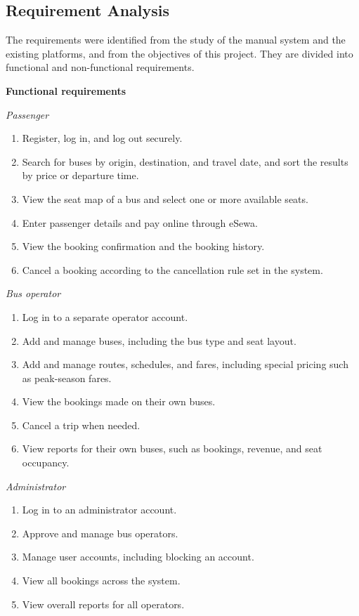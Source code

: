 \subsection{Requirement Analysis}

The requirements were identified from the study of the manual system and the existing platforms, and from the objectives of this project. They are divided into functional and non-functional requirements.

\textbf{Functional requirements}

\textit{Passenger}
\begin{enumerate}
	\item Register, log in, and log out securely.
	\item Search for buses by origin, destination, and travel date, and sort the results by price or departure time.
	\item View the seat map of a bus and select one or more available seats.
	\item Enter passenger details and pay online through eSewa.
	\item View the booking confirmation and the booking history.
	\item Cancel a booking according to the cancellation rule set in the system.
\end{enumerate}

\textit{Bus operator}
\begin{enumerate}
	\item Log in to a separate operator account.
	\item Add and manage buses, including the bus type and seat layout.
	\item Add and manage routes, schedules, and fares, including special pricing such as peak-season fares.
	\item View the bookings made on their own buses.
	\item Cancel a trip when needed.
	\item View reports for their own buses, such as bookings, revenue, and seat occupancy.
\end{enumerate}

\textit{Administrator}
\begin{enumerate}
	\item Log in to an administrator account.
	\item Approve and manage bus operators.
	\item Manage user accounts, including blocking an account.
	\item View all bookings across the system.
	\item View overall reports for all operators.
\end{enumerate}

